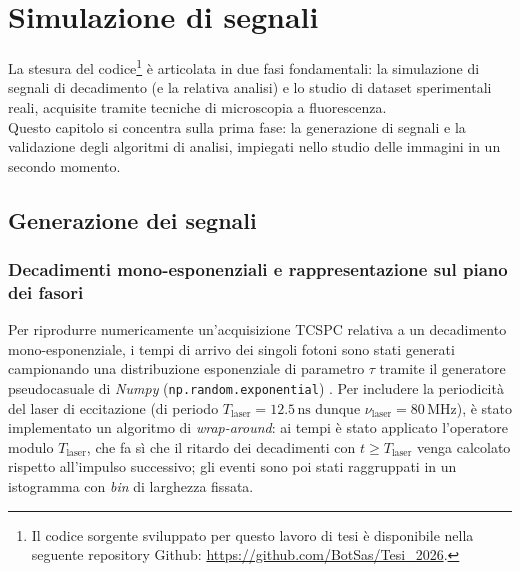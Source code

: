 \chapter{Simulazione di segnali} %
\label{sec:sviluppo_del_modello} 

La stesura del codice\footnote{Il codice sorgente sviluppato per questo lavoro di tesi è disponibile nella seguente repository Github: \url{https://github.com/BotSas/Tesi_2026}.} è articolata in due fasi fondamentali: la simulazione di segnali di decadimento (e la relativa analisi) e lo studio di dataset sperimentali reali, acquisite tramite tecniche di microscopia a fluorescenza.\\
Questo capitolo si concentra sulla prima fase: la generazione di segnali e la validazione degli algoritmi di analisi, impiegati nello studio delle  immagini in un secondo momento.




\section{Generazione dei segnali} %
\label{sec:generazione_dei_segnali}

\subsection{Decadimenti mono-esponenziali e rappresentazione sul piano dei fasori} %

Per riprodurre numericamente un'acquisizione TCSPC relativa a un decadimento mono-esponenziale, i tempi di arrivo dei singoli fotoni sono stati generati campionando una distribuzione esponenziale di parametro $\tau$ tramite il generatore pseudocasuale di \textit{Numpy} (\texttt{np.random.exponential}) \cite{harrisArrayProgrammingNumPy2020}. Per includere la periodicità del laser di eccitazione (di periodo $T_{\text{laser}}=12.5\,\text{ns}$ dunque $\nu_{\text{laser}}=80\,\text{MHz}$), è stato implementato un algoritmo di \textit{wrap-around}: ai tempi è stato applicato l'operatore modulo $T_\text{laser}$, che fa sì che il ritardo dei decadimenti con $t\ge T_{\text{laser}}$ venga calcolato rispetto all'impulso successivo; gli eventi sono poi stati raggruppati in un istogramma con \textit{bin} di larghezza fissata.

